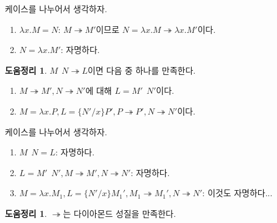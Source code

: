\documentclass[b5paper, 11pt]{book}
\theoremstyle{definition}
\newtheorem{lem}[defn]{도움정리}
\newenvironment{pf*}{\pushQED{\qed}\pf}
{\popQED\endpf}
\begin{document}
\begin{pf*}
    케이스를 나누어서 생각하자.
    \begin{enumerate}
        \item $\lambda x. M = N$: $M \twoheadrightarrow M'$이므로 $N = \lambda x .M
        \twoheadrightarrow \lambda x. M'$이다.
        \item $N = \lambda x . M'$: 자명하다.
    \end{enumerate}
\end{pf*}
\begin{lem} \label{application lemma}
    $M \;\, N \twoheadrightarrow L$이면 다음 중 하나를 만족한다.
    \begin{enumerate}
        \item $M \twoheadrightarrow M', N \twoheadrightarrow N'$에 대해 $L = M' \;\, N'$이다.
        \item $M = \lambda x. P, L = \{N' / x\} P', P \twoheadrightarrow P',  N \twoheadrightarrow N'$이다.
    \end{enumerate}
\end{lem}
\begin{pf*}
    케이스를 나누어서 생각하자.
    \begin{enumerate}
        \item $M\;\, N = L$: 자명하다. 
        \item $L = M' \;\, N' , M \twoheadrightarrow M', N \twoheadrightarrow N'$: 자명하다.
        \item $M = \lambda x. M_1 ,L = \{N'/x\} M_1', M_1 \twoheadrightarrow M_1', N \twoheadrightarrow N'$: 이것도 자명하다...
    \end{enumerate}
\end{pf*}
\begin{lem} \label{twohead diamond}
    $\twoheadrightarrow$는 다이아몬드 성질을 만족한다.
\end{lem}
\end{document}
